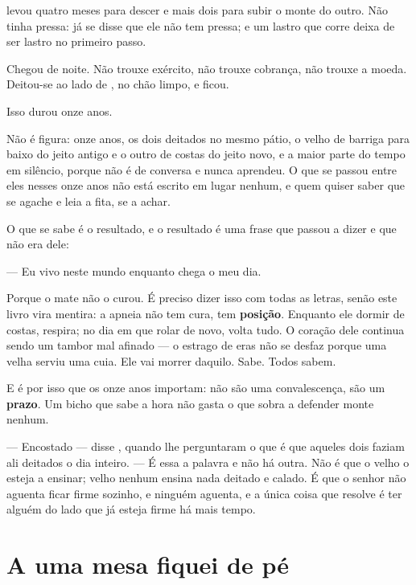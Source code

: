 \documentclass[livro.tex]{subfiles}
\begin{document}
\Odo levou quatro meses para descer e mais dois para subir o monte do outro. Não tinha pressa: já
se disse que ele não tem pressa; e um lastro que corre deixa de ser lastro no primeiro passo.

Chegou de noite. Não trouxe exército, não trouxe cobrança, não trouxe a moeda. Deitou-se ao lado
de \Ven , no chão limpo, e ficou.

\medskip

Isso durou onze anos.

Não é figura: onze anos, os dois deitados no mesmo pátio, o velho de barriga para baixo do jeito
antigo e o outro de costas do jeito novo, e a maior parte do tempo em silêncio, porque \Odo não é
de conversa e \Ven nunca aprendeu. O que se passou entre eles nesses onze anos não está escrito
em lugar nenhum, e quem quiser saber que se agache e leia a fita, se a achar.

O que se sabe é o resultado, e o resultado é uma frase que \Ven passou a dizer e que não era
dele:

--- Eu vivo neste mundo enquanto chega o meu dia.

\medskip

Porque o mate não o curou. É preciso dizer isso com todas as letras, senão este livro vira
mentira: a apneia não tem cura, tem \textbf{posição}. Enquanto ele dormir de costas, respira;
no dia em que rolar de novo, volta tudo. O coração dele continua sendo um tambor mal afinado ---
o estrago de eras não se desfaz porque uma velha serviu uma cuia. Ele vai morrer daquilo. Sabe.
Todos sabem.

E é por isso que os onze anos importam: não são uma convalescença, são um \textbf{prazo}. Um
bicho que sabe a hora não gasta o que sobra a defender monte nenhum.

--- Encostado --- disse \Qui , quando lhe perguntaram o que é que aqueles dois faziam ali
deitados o dia inteiro. --- É essa a palavra e não há outra. Não é que o velho o esteja a
ensinar; velho nenhum ensina nada deitado e calado. É que o senhor não aguenta ficar firme
sozinho, e ninguém aguenta, e a única coisa que resolve é ter alguém do lado que já esteja firme
há mais tempo.

\section{A uma mesa fiquei de pé}
\end{document}
